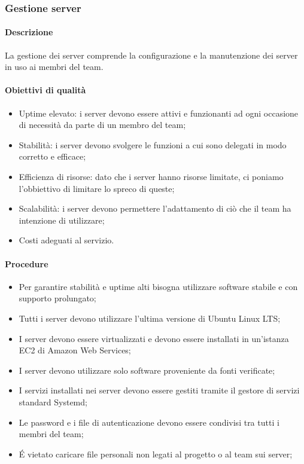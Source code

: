 \documentclass[../NormeDiProgetto_v4.0.0.tex]{subfiles}
\begin{document}
	\subsubsection{Gestione server}
      \paragraph{Descrizione}
        La gestione dei server comprende la configurazione e la manutenzione dei server in uso ai membri del team.
      \paragraph{Obiettivi di qualità}
          \begin{itemize}
            \item Uptime elevato: i server devono essere attivi e funzionanti ad ogni occasione di necessità da parte di un membro del team;
            \item Stabilità: i server devono svolgere le funzioni a cui sono delegati in modo corretto e efficace;
            \item Efficienza di risorse: dato che i server hanno risorse limitate, ci poniamo l'obbiettivo di limitare lo spreco di queste;
            \item Scalabilità: i server devono permettere l'adattamento di ciò che il team ha intenzione di utilizzare;
            \item Costi adeguati al servizio.
          \end{itemize}
      \paragraph{Procedure}
        \begin{itemize}
            \item Per garantire stabilità e uptime alti bisogna utilizzare software stabile e con supporto prolungato;
            \item Tutti i server devono utilizzare l'ultima versione di Ubuntu Linux LTS;
            \item I server devono essere virtualizzati e devono essere installati in un'istanza EC2 di Amazon Web Services;
            \item I server devono utilizzare solo software proveniente da fonti verificate;
            \item I servizi installati nei server devono essere gestiti tramite il gestore di servizi standard Systemd;
            \item Le password e i file di autenticazione devono essere condivisi tra tutti i membri del team;
            \item É vietato caricare file personali non legati al progetto o al team sui server;
        \end{itemize}
		
\end{document}
